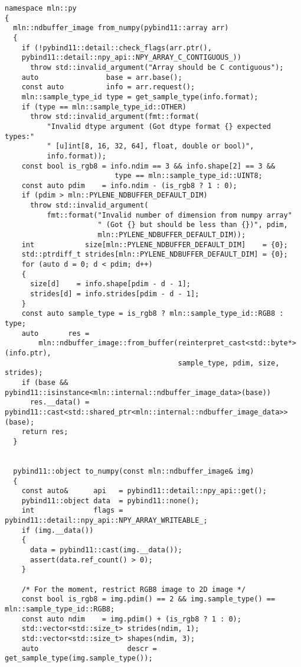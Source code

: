 \begin{verbatim}
namespace mln::py
{
  mln::ndbuffer_image from_numpy(pybind11::array arr)
  {
    if (!pybind11::detail::check_flags(arr.ptr(),
    pybind11::detail::npy_api::NPY_ARRAY_C_CONTIGUOUS_))
      throw std::invalid_argument("Array should be C contiguous");
    auto                base = arr.base();
    const auto          info = arr.request();
    mln::sample_type_id type = get_sample_type(info.format);
    if (type == mln::sample_type_id::OTHER)
      throw std::invalid_argument(fmt::format(
          "Invalid dtype argument (Got dtype format {} expected types:"
          " [u]int[8, 16, 32, 64], float, double or bool)",
          info.format));
    const bool is_rgb8 = info.ndim == 3 && info.shape[2] == 3 &&
                          type == mln::sample_type_id::UINT8;
    const auto pdim    = info.ndim - (is_rgb8 ? 1 : 0);
    if (pdim > mln::PYLENE_NDBUFFER_DEFAULT_DIM)
      throw std::invalid_argument(
          fmt::format("Invalid number of dimension from numpy array"
                      " (Got {} but should be less than {})", pdim,
                      mln::PYLENE_NDBUFFER_DEFAULT_DIM));
    int            size[mln::PYLENE_NDBUFFER_DEFAULT_DIM]    = {0};
    std::ptrdiff_t strides[mln::PYLENE_NDBUFFER_DEFAULT_DIM] = {0};
    for (auto d = 0; d < pdim; d++)
    {
      size[d]    = info.shape[pdim - d - 1];
      strides[d] = info.strides[pdim - d - 1];
    }
    const auto sample_type = is_rgb8 ? mln::sample_type_id::RGB8 : type;
    auto       res =
        mln::ndbuffer_image::from_buffer(reinterpret_cast<std::byte*>(info.ptr),
                                         sample_type, pdim, size, strides);
    if (base && pybind11::isinstance<mln::internal::ndbuffer_image_data>(base))
      res.__data() = pybind11::cast<std::shared_ptr<mln::internal::ndbuffer_image_data>>(base);
    return res;
  }


  pybind11::object to_numpy(const mln::ndbuffer_image& img)
  {
    const auto&      api   = pybind11::detail::npy_api::get();
    pybind11::object data  = pybind11::none();
    int              flags = pybind11::detail::npy_api::NPY_ARRAY_WRITEABLE_;
    if (img.__data())
    {
      data = pybind11::cast(img.__data());
      assert(data.ref_count() > 0);
    }

    /* For the moment, restrict RGB8 image to 2D image */
    const bool is_rgb8 = img.pdim() == 2 && img.sample_type() == mln::sample_type_id::RGB8;
    const auto ndim    = img.pdim() + (is_rgb8 ? 1 : 0);
    std::vector<std::size_t> strides(ndim, 1);
    std::vector<std::size_t> shapes(ndim, 3);
    auto                     descr = get_sample_type(img.sample_type());


\end{verbatim}
